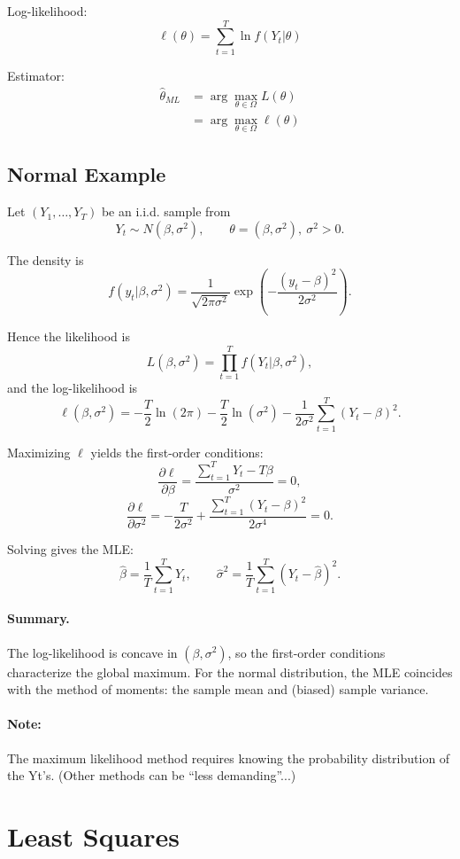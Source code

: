 Log-likelihood:
\[
\ell(\theta) = \sum_{t=1}^T \ln f(Y_t|\theta)
\]

Estimator:
\[
\begin{aligned}
\hat{\theta}_{ML} 
&= \arg\max_{\theta \in \Omega} L(\theta)\\
&= \arg\max_{\theta \in \Omega} \ell(\theta)
\end{aligned}
\]

\subsection{Normal Example}

Let $(Y_1,\dots,Y_T)$ be an i.i.d. sample from
\[
Y_t \sim N(\beta,\sigma^2),
\qquad \theta=(\beta,\sigma^2),\ \sigma^2>0.
\]

The density is
\[
f(y_t|\beta,\sigma^2)
=
\frac{1}{\sqrt{2\pi\sigma^2}}
\exp\!\left(-\frac{(y_t-\beta)^2}{2\sigma^2}\right).
\]

Hence the likelihood is
\[
L(\beta,\sigma^2)
=
\prod_{t=1}^T f(Y_t|\beta,\sigma^2),
\]
and the log-likelihood is
\[
\ell(\beta,\sigma^2)
=
-\frac{T}{2}\ln(2\pi)
-\frac{T}{2}\ln(\sigma^2)
-\frac{1}{2\sigma^2}\sum_{t=1}^T (Y_t-\beta)^2.
\]

Maximizing $\ell$ yields the first-order conditions:
\[
\frac{\partial \ell}{\partial \beta}
=
\frac{\sum_{t=1}^T Y_t - T\beta}{\sigma^2}=0,
\]
\[
\frac{\partial \ell}{\partial \sigma^2}
=
-\frac{T}{2\sigma^2}
+
\frac{\sum_{t=1}^T (Y_t-\beta)^2}{2\sigma^4}=0.
\]

Solving gives the MLE:
\[
\hat{\beta}
=
\frac{1}{T}\sum_{t=1}^T Y_t,
\qquad
\hat{\sigma}^2
=
\frac{1}{T}\sum_{t=1}^T (Y_t-\hat{\beta})^2.
\]

\paragraph{Summary.}
The log-likelihood is concave in $(\beta,\sigma^2)$, so the first-order conditions characterize the global maximum. 
For the normal distribution, the MLE coincides with the method of moments:
the sample mean and (biased) sample variance.

\paragraph{Note:} 
The maximum likelihood method requires knowing the probability distribution of the Yt’s. (Other methods can be “less demanding”...)

\section{Least Squares}

